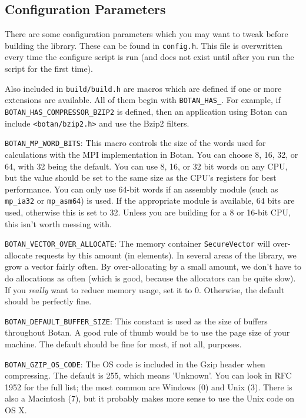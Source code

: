 \documentclass{article}
\newcommand{\filename}[1]{\texttt{#1}}
\newcommand{\module}[1]{\texttt{#1}}
\newcommand{\type}[1]{\texttt{#1}}
\newcommand{\macro}[1]{\texttt{#1}}
\begin{document}
\pagebreak

\subsection{Configuration Parameters}

There are some configuration parameters which you may want to tweak
before building the library. These can be found in
\filename{config.h}. This file is overwritten every time the configure
script is run (and does not exist until after you run the script for
the first time).

Also included in \filename{build/build.h} are macros which are defined
if one or more extensions are available. All of them begin with
\verb|BOTAN_HAS_|. For example, if \verb|BOTAN_HAS_COMPRESSOR_BZIP2|
is defined, then an application using Botan can include
\filename{<botan/bzip2.h>} and use the Bzip2 filters.

\macro{BOTAN\_MP\_WORD\_BITS}: This macro controls the size of the
words used for calculations with the MPI implementation in Botan. You
can choose 8, 16, 32, or 64, with 32 being the default. You can use 8,
16, or 32 bit words on any CPU, but the value should be set to the
same size as the CPU's registers for best performance. You can only
use 64-bit words if an assembly module (such as \module{mp\_ia32} or
\module{mp\_asm64}) is used. If the appropriate module is available,
64 bits are used, otherwise this is set to 32. Unless you are building
for a 8 or 16-bit CPU, this isn't worth messing with.

\macro{BOTAN\_VECTOR\_OVER\_ALLOCATE}: The memory container
\type{SecureVector} will over-allocate requests by this amount (in
elements). In several areas of the library, we grow a vector fairly often. By
over-allocating by a small amount, we don't have to do allocations as often
(which is good, because the allocators can be quite slow). If you \emph{really}
want to reduce memory usage, set it to 0. Otherwise, the default should be
perfectly fine.

\macro{BOTAN\_DEFAULT\_BUFFER\_SIZE}: This constant is used as the size of
buffers throughout Botan. A good rule of thumb would be to use the page size of
your machine. The default should be fine for most, if not all, purposes.

\macro{BOTAN\_GZIP\_OS\_CODE}: The OS code is included in the Gzip header when
compressing. The default is 255, which means 'Unknown'. You can look in RFC
1952 for the full list; the most common are Windows (0) and Unix (3). There is
also a Macintosh (7), but it probably makes more sense to use the Unix code on
OS X.
\end{document}
